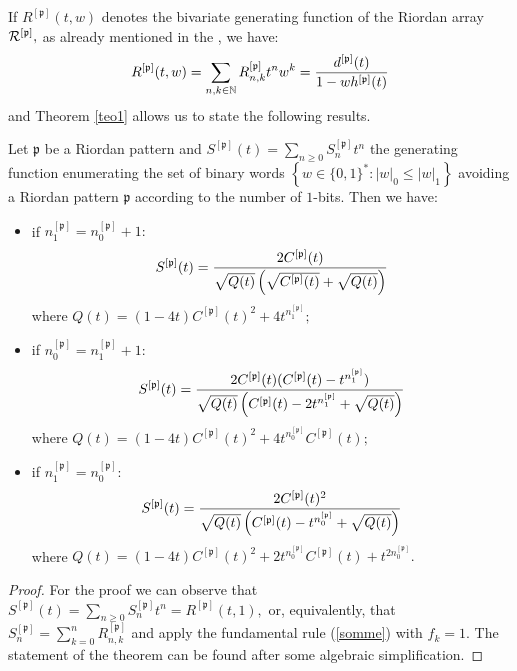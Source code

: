 If $R^{[\mathfrak{p}]}(t,w)$ denotes the bivariate generating function of the
Riordan array ${\cal{R}^{[\mathfrak{p}]}},$ as already mentioned in the
, we have:
$$R^{[\mathfrak{p}]}(t,w)=\sum_{n,k\in\mathbb{N}} R_{n, k}^{[\mathfrak{p}]}t^n
w^k={d^{[\mathfrak{p}]}(t) \over 1-wh^{[\mathfrak{p}]}(t)}$$ and Theorem
\ref{teo1} allows us to state the following results.

\begin{theorem}
\label{teo2}
Let $\mathfrak{p}$ be  a Riordan pattern and $S^{[\mathfrak{p}]}(t)=\sum_{n\geq
0}S_n^{[\mathfrak{p}]}t^n$ the generating function enumerating the set of binary words $\left\lbrace w\in
\lbrace 0,1 \rbrace^{*}: |w|_0\leq |w|_1\right\rbrace$ avoiding  a Riordan
pattern $\mathfrak{p}$ according to the number of $1$-bits. Then we have:

\begin{itemize}

\item if $n_1^{[\mathfrak{p}]}=n_0^{[\mathfrak{p}]}+1:$
$$S^{[\mathfrak{p}]}(t)={2C^{[\mathfrak{p}]}(t) \over \sqrt{Q(t)}\left(\sqrt{C^{[\mathfrak{p}]}(t)}+ \sqrt{Q(t)} \right)} $$
    where $Q(t)={(1-4t)C^{[\mathfrak{p}]}(t)^2+4t^{n_1^{[\mathfrak{p}]}}};$

\item if $n_0^{[\mathfrak{p}]}=n_1^{[\mathfrak{p}]}+1:$
$$S^{[\mathfrak{p}]}(t)={2C^{[\mathfrak{p}]}(t)(C^{[\mathfrak{p}]}(t)-t^{n_1^{[\mathfrak{p}]}}
) \over \sqrt{Q(t)} \left(C^{[\mathfrak{p}]}(t)-2t^{n_1^{[\mathfrak{p}]}}+ \sqrt{Q(t)} \right) }$$
    where $Q(t)={ (1-4t)C^{[\mathfrak{p}]}(t)^2+4t^{n_0^{[\mathfrak{p}]}}C^{[\mathfrak{p}]}(t)};$

\item if $n_1^{[\mathfrak{p}]}=n_0^{[\mathfrak{p}]}:$
$$S^{[\mathfrak{p}]}(t)={2C^{[\mathfrak{p}]}(t)^2 \over \sqrt{Q(t)}
    \left(C^{[\mathfrak{p}]}(t)-t^{n_0^{[\mathfrak{p}]}}+ \sqrt{Q(t)} \right) }$$
where $Q(t)=(1-4t)C^{[\mathfrak{p}]}(t)^2+2t^{n_0^{[\mathfrak{p}]}}C^{[\mathfrak{p}]}(t)+t^{2n_0^{[\mathfrak{p}]}}.$

\end{itemize}
\end{theorem}
\begin{proof}
For the proof we can observe that $S^{[\mathfrak{p}]}(t)=\sum_{n\geq
0}S_n^{[\mathfrak{p}]}t^n=R^{[\mathfrak{p}]}(t,1),$ or, equivalently, that
$S_n^{[\mathfrak{p}]}=\sum_{k=0}^nR_{n, k}^{[\mathfrak{p}]}$ and apply the
fundamental rule (\ref{somme}) with $f_k=1.$ The statement of the theorem can
be found after some algebraic simplification.
\end{proof}

